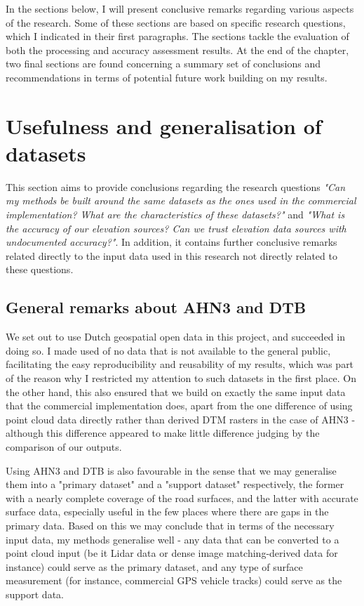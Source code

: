In the sections below, I will present conclusive remarks regarding various aspects of the research. Some of these sections are based on specific research questions, which I indicated in their first paragraphs. The sections tackle the evaluation of both the processing and accuracy assessment results. At the end of the chapter, two final sections are found concerning a summary set of conclusions and recommendations in terms of potential future work building on my results.

\section{Usefulness and generalisation of datasets}
\label{sec:usefulness}

This section aims to provide conclusions regarding the research questions \textit{"Can my methods be built around the same datasets as the ones used in the commercial implementation? What are the characteristics of these datasets?"} and \textit{"What is the accuracy of our elevation sources? Can we trust elevation data sources with undocumented accuracy?"}. In addition, it contains further conclusive remarks related directly to the input data used in this research not directly related to these questions.

\subsection{General remarks about AHN3 and DTB}
\label{sub:usefulnessgeneral}

We set out to use Dutch geospatial open data in this project, and succeeded in doing so. I made used of no data that is not available to the general public, facilitating the easy reproducibility and reusability of my results, which was part of the reason why I restricted my attention to such datasets in the first place. On the other hand, this also ensured that we build on exactly the same input data that the commercial implementation does, apart from the one difference of using point cloud data directly rather than derived DTM rasters in the case of AHN3 - although this difference appeared to make little difference judging by the comparison of our outputs.

Using AHN3 and DTB is also favourable in the sense that we may generalise them into a "primary dataset" and a "support dataset" respectively, the former with a nearly complete coverage of the road surfaces, and the latter with accurate surface data, especially useful in the few places where there are gaps in the primary data. Based on this we may conclude that in terms of the necessary input data, my methods generalise well - any data that can be converted to a point cloud input (be it Lidar data or dense image matching-derived data for instance) could serve as the primary dataset, and any type of surface measurement (for instance, commercial GPS vehicle tracks) could serve as the support data.

